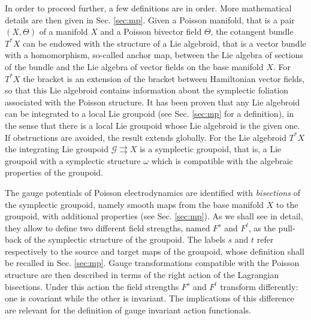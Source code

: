 \documentclass[12pt,a4paper]{article}
\numberwithin{equation}{section}
\theoremstyle{definition}
\newcommand{\cG}{\mathcal{G}}
\begin{document}
In order to proceed further, a few  definitions are in order. More mathematical details are then given in Sec. \ref{sec:mp}.
Given a Poisson manifold, that is a pair $(X,\Theta)$ of a manifold $X$ and a  Poisson bivector field $\Theta$,  %
the  cotangent bundle $T^*X$ can be endowed with the structure of a Lie algebroid, that is a vector bundle with a  homomorphism,  so-called anchor map, between the Lie algebra of sections of the bundle and the Lie algebra of vector fields on the base manifold $X$.
For  $T^*X$ the bracket is an extension of the bracket between Hamiltonian vector fields, so that this Lie algebroid contains information about the symplectic foliation associated with the Poisson structure. It has been proven \cite{Crainic} that any Lie algebroid can be integrated to a local Lie groupoid (see Sec. \ref{sec:mp} for a definition), in the sense that there is a local Lie groupoid whose Lie algebroid is the given one. If  obstructions are avoided, the result  extends globally. 
For  the Lie algebroid $T^*X$ the integrating Lie groupoid $\cG \rightrightarrows X$ is a symplectic groupoid, that is, a Lie groupoid  with a symplectic structure $\omega$ which is compatible with the algebraic properties of the groupoid. %

The gauge potentials of Poisson electrodynamics are identified with  {\it bisections} of the symplectic groupoid, namely smooth maps from the base manifold $X$ to the groupoid, with additional properties (see Sec. \ref{sec:mp}). As we shall see in detail, they allow to define two different field strengths, named $F^s$ and $F^t$, as the pull-back of the symplectic structure of the groupoid. The labels $s$ and $t$ refer respectively to the source and target maps of the groupoid, whose definition shall be recalled in Sec. \ref{sec:mp}. 
Gauge transformations compatible with the Poisson structure are then described in terms of the right action of the Lagrangian bisections. Under this action  the field strengths $F^s$ and $F^t$ transform differently: one is covariant while the other is invariant. The implications of this difference are relevant for the definition of gauge invariant action functionals.
\end{document}
